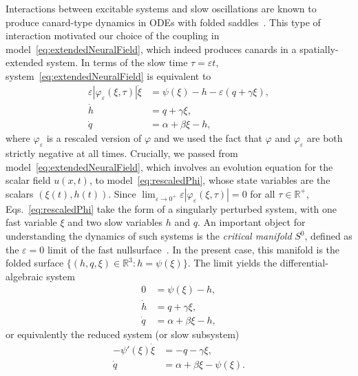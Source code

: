 \documentclass[aps,prl,reprint,superscriptaddress]{revtex4-1}
\newcommand{\RSet}{\mathbb{R}}
\newcommand{\epsi}{\varepsilon}
\begin{document}
Interactions between excitable systems and slow oscillations are
known to produce canard-type dynamics in ODEs with folded
saddles~\cite{Mitry2013,desroches2016spike}. This type of interaction motivated our
choice of the coupling in model~\eqref{eq:extendedNeuralField}, which indeed produces
canards in a spatially-extended system.
In terms of the slow time $\tau = \epsi t$, system~\eqref{eq:extendedNeuralField} is
equivalent to
\begin{equation}\label{eq:rescaledPhi}
\begin{aligned}
  \epsi | \varphi_\epsi( \xi, \tau) | \dot \xi & = \psi(\xi) - h - \epsi (q + \gamma \xi), \\
  \dot h & = q + \gamma \xi, \\
  \dot q & = \alpha + \beta \xi - h,
\end{aligned}
\end{equation}
where $\varphi_\epsi$ is a rescaled version of $\varphi$ and we used the fact
that $\varphi$ and $\varphi_\epsi$ are both strictly negative at all times.
Crucially, we passed from model~\eqref{eq:extendedNeuralField}, which involves an
evolution equation for the scalar field $u(x,t)$, to model~\eqref{eq:rescaledPhi}, whose
state variables are the scalars $(\xi(t),h(t))$.
Since $\lim_{\epsi \to 0^+} \epsi | \varphi_\epsi( \xi, \tau) | = 0$ for all $\tau\in \RSet^+$,
Eqs.~\eqref{eq:rescaledPhi} take the form of a singularly perturbed
system, with one fast variable $\xi$ and two slow variables $h$ and $q$. An important
object for understanding the dynamics of such systems is the \textit{critical
manifold} $S^0$, defined as the $\epsi=0$ limit of the fast
nullsurface~\cite{Krupa2001}. In the
present case, this manifold is the folded surface
$\{(h,q,\xi) \in \RSet^3 \colon h = \psi(\xi)\}$. 
The limit yields the differential-algebraic system
\begin{equation}\label{eq:DAE}
\begin{aligned}
         0 & = \psi(\xi) - h,\\
  \dot h & = q + \gamma \xi, \\
  \dot q & = \alpha + \beta \xi - h,
\end{aligned}
\end{equation}
or equivalently the reduced system (or slow subsystem)
\begin{equation}\label{eq:slowFlow}
\begin{aligned}
  -\psi'(\xi) \dot \xi & = - q - \gamma \xi,\\
  \dot q & = \alpha + \beta \xi - \psi(\xi).
\end{aligned}
\end{equation}
\end{document}
